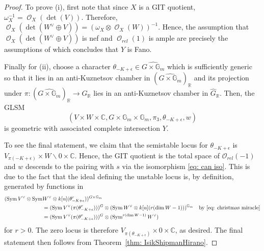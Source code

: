 \documentclass[reqno, 12pt]{amsart}
\theoremstyle{definition}
\newcommand{\op}[1]{\operatorname{#1}}
\newcommand{\gm}{\mathbb{G}_m}
\def\R{\op{\mathbb{R}}}
\def\O{\op{\mathcal{O}}}
\numberwithin{equation}{section}
\begin{document}
\begin{proof}
To prove (i), first note that  since $X$ is a GIT quotient, $\omega_X^{-1} = \O_X(\det(V))$.  Therefore, $\O_X(\det(W^\vee \oplus V)) = (\omega_X \otimes \O_X(W))^{-1}$.  Hence, the assumption that $\O_X(\det(W^\vee \oplus V))$ is nef and $\O_{rel}(1)$ is ample are precisely the assumptions of \cite[Lemma 3.1]{KKLL} which concludes that $Y$ is Fano.

Finally for (ii), choose a character $\theta_{-K + \epsilon} \in \widehat{G \times \gm}$ which is sufficiently generic so that it lies in an anti-Kuznetsov chamber in $(\widehat{G \times \gm})_{\mathbb R}$ and its projection under $\pi: (\widehat{G \times \gm})_{\mathbb R} \to \widehat{G}_{\R}$ lies in an anti-Kuznetsov chamber in $\widehat{G}_{\mathbb R}$.
Then, the GLSM 
$$(V \times W \times \mathbb C, G \times \gm \times \gm, \pi_3, \theta_{-K + \epsilon}, w)$$ is geometric with associated complete intersection $Y$. 


To see the final statement, we claim that the semistable locus for $\theta_{-K + \epsilon}$ is $V_{\pi(-K + \epsilon)} \times W \backslash 0 \times \mathbb C$.  Hence, the GIT quotient is the total space of $\mathcal O_{rel}(-1)$ and $w$ descends to the pairing with $s$ via the isomorphism \eqref{eq: can iso}.  This is due to the fact that the ideal defining the unstable locus is, by definition, generated by functions in
\begin{align*}
(\op{Sym}V^\vee \otimes\op{Sym}&W^\vee \otimes k[u](\theta_{-K + \epsilon}^r))^{G \times \gm} \\& = (\op{Sym}V^\vee(\pi(\theta_{-K + \epsilon}^r)))^G\otimes (\op{Sym} W^\vee \otimes k[u](r(\dim W-1)))^{\gm} & \text{by \eqref{eq: christmas miracle}} \\
& = (\op{Sym}V^\vee(\pi(\theta_{-K + \epsilon}^r)))^G\otimes (\op{Sym}^{r(\dim W-1)}W^\vee)
\end{align*}
for $r >0$.  The zero locus is therefore $V_{\pi(\theta_{-K + \epsilon})} \times 0 \times \mathbb C$, as desired. The final statement then follows from Theorem~\ref{thm: IsikShipmanHirano}.
\end{proof}
\end{document}
